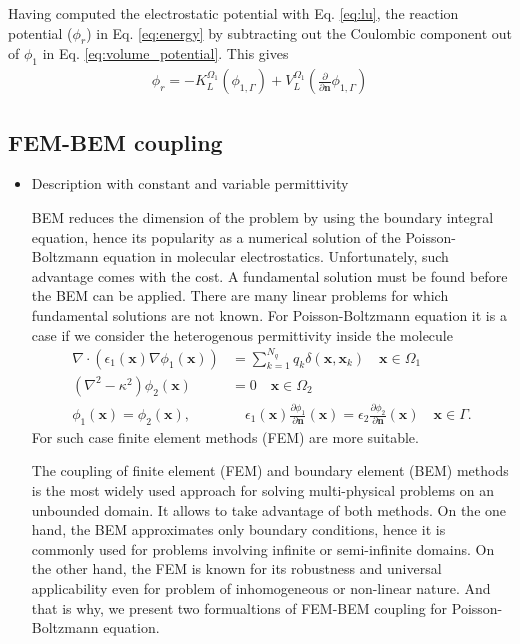 Having computed the electrostatic potential with Eq. \eqref{eq:lu}, the reaction potential ($\phi_r$) in Eq. \eqref{eq:energy} by subtracting out the Coulombic component out of $\phi_1$ in Eq. \eqref{eq:volume_potential}. This gives
%
\begin{align} \label{eq:phi_reac}
\phi_{r} = - K_{L}^{\Omega_1}(\phi_{1,\Gamma}) + V_{L}^{\Omega_1} \left(\frac{\partial}{\partial \mathbf{n}}  \phi_{1,\Gamma}  \right)
\end{align}

\subsection*{\sffamily \large FEM-BEM coupling}

\begin{itemize}
    \item Description with constant and variable permittivity 
    
BEM reduces the dimension of the problem by using the boundary integral equation, hence its popularity as a numerical solution of  the Poisson-Boltzmann equation in molecular electrostatics. Unfortunately, such advantage comes with the cost. A fundamental solution must be found before the BEM can be applied. There are many linear problems for which fundamental solutions are not known. For Poisson-Boltzmann equation it is a case if we consider the heterogenous permittivity inside the molecule
   \begin{align} \label{eq:pbe_vp}
\nabla \cdot \left(\epsilon_1(\mathbf{x}) \nabla \phi_1(\mathbf{x})\right) &= \sum_{k=1}^{N_q} q_k\delta(\mathbf{x},\mathbf{x}_k) \quad  \mathbf{x} \in \Omega_1\nonumber\\
\left(\nabla^2 - \kappa^2\right)\phi_2(\mathbf{x})  &= 0 \quad\mathbf{x}\in\Omega_2\nonumber\\
\phi_1(\mathbf{x})  = \phi_2(\mathbf{x}),  &\quad \epsilon_1(\mathbf{x})\frac{\partial\phi_1}{\partial\mathbf{n}}(\mathbf{x})  = \epsilon_2\frac{\partial\phi_2}{\partial\mathbf{n}}(\mathbf{x})  \quad \mathbf{x}\in \Gamma. 
\end{align}
For such case finite element methods (FEM) are more suitable.

The coupling of finite element (FEM) and boundary element (BEM) methods is the most widely used approach for solving multi-physical problems on an unbounded domain. It allows to take advantage of both methods. On the one hand, the BEM approximates only boundary conditions, hence it is commonly used for problems involving infinite or semi-infinite domains. On the other hand, the FEM is known for its robustness and universal applicability even for problem of inhomogeneous or non-linear nature.
And that is why, we present two formualtions of FEM-BEM coupling for Poisson-Boltzmann equation.
    

\end{itemize}
